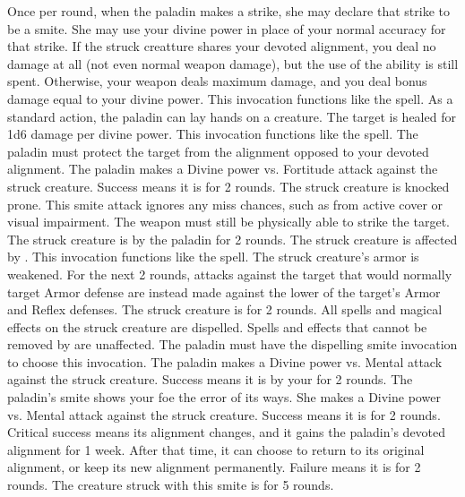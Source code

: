         Once per round, when the paladin makes a strike, she may declare that strike to be a smite.
        She may use your divine power in place of your normal accuracy for that strike.
        If the struck creatture shares your devoted alignment, you deal no damage at all (not even normal weapon damage), but the use of the ability is still spent.
        Otherwise, your weapon deals maximum damage, and you deal bonus damage equal to your divine power.
         This invocation functions like the  spell.
        As a standard action, the paladin can lay hands on a creature.
        The target is healed for 1d6 damage per divine power.
         This invocation functions like the  spell.
        The paladin must protect the target from the alignment opposed to your devoted alignment.
        The paladin makes a Divine power vs. Fortitude attack against the struck creature.
        Success means it is \exhausted for 2 rounds.
        The struck creature is knocked prone.
        This smite attack ignores any miss chances, such as from active cover or visual impairment.
        The weapon must still be physically able to strike the target.
        The struck creature is \goaded by the paladin for 2 rounds.
        The struck creature is affected by .
        This invocation functions like the  spell.
        The struck creature's armor is weakened.
        For the next 2 rounds, attacks against the target that would normally target Armor defense are instead made against the lower of the target's Armor and Reflex defenses.
        The struck creature is \dazed for 2 rounds.
        All spells and magical effects on the struck creature are dispelled.
        Spells and effects that cannot be removed by  are unaffected.
        The paladin must have the dispelling smite invocation to choose this invocation.
        The paladin makes a Divine power vs. Mental attack against the struck creature.
        Success means it is \frightened by your for 2 rounds.
        The paladin's smite shows your foe the error of its ways.
        She makes a Divine power vs. Mental attack against the struck creature.
        Success means it is \confused for 2 rounds.
        Critical success means its alignment changes, and it gains the paladin's devoted alignment for 1 week.
        After that time, it can choose to return to its original alignment, or keep its new alignment permanently.
        Failure means it is \dazed for 2 rounds.
        The creature struck with this smite is \immobilized for 5 rounds.

